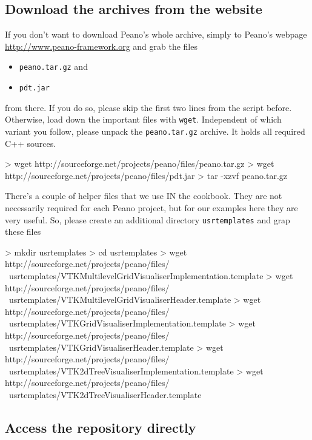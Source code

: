 \subsection{Download the archives from the website}

If you don't want to download Peano's whole archive, simply to Peano's webpage
\url{http://www.peano-framework.org} and grab the files
\begin{itemize}
  \item \texttt{peano.tar.gz} and
  \item \texttt{pdt.jar}
\end{itemize}
from there. If you do so, please skip the first two lines from the script
before. Otherwise, load down the important files with \texttt{wget}. 
Independent of which variant you follow, please unpack the \texttt{peano.tar.gz}
archive. 
It holds all required C++ sources.

\begin{code}
> wget http://sourceforge.net/projects/peano/files/peano.tar.gz
> wget http://sourceforge.net/projects/peano/files/pdt.jar
> tar -xzvf peano.tar.gz
\end{code}


\noindent
There's a couple of helper files that we use IN the
cookbook. 
They are not necessarily required for each Peano project, but for our examples
here they are very useful.
So, please create an additional directory \texttt{usrtemplates} and grap
these files

\begin{code}
> mkdir usrtemplates
> cd usrtemplates
> wget http://sourceforge.net/projects/peano/files/ \
  usrtemplates/VTKMultilevelGridVisualiserImplementation.template 
> wget http://sourceforge.net/projects/peano/files/ \
  usrtemplates/VTKMultilevelGridVisualiserHeader.template 
> wget http://sourceforge.net/projects/peano/files/ \
  usrtemplates/VTKGridVisualiserImplementation.template 
> wget http://sourceforge.net/projects/peano/files/ \
  usrtemplates/VTKGridVisualiserHeader.template 
> wget http://sourceforge.net/projects/peano/files/ \
  usrtemplates/VTK2dTreeVisualiserImplementation.template 
> wget http://sourceforge.net/projects/peano/files/ \
  usrtemplates/VTK2dTreeVisualiserHeader.template 
\end{code}

\subsection{Access the repository directly}


